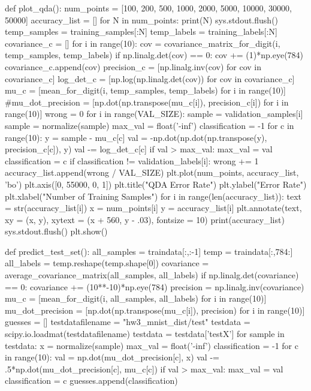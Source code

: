 \documentclass{article}
\begin{document}
\begin{python}
def plot_qda():
    num_points = [100, 200, 500, 1000, 2000, 5000, 10000, 30000, 50000]
    accuracy_list = []
    for N in num_points:
        print(N)
        sys.stdout.flush()
        temp_samples = training_samples[:N]
        temp_labels = training_labels[:N]
        covariance_c = []
        for i in range(10):
            cov = covariance_matrix_for_digit(i, temp_samples, temp_labels)
            if np.linalg.det(cov) == 0:
                cov += (1)*np.eye(784)
            covariance_c.append(cov)
        precision_c = [np.linalg.inv(cov) for cov in covariance_c]
        log_det_c = [np.log(np.linalg.det(cov)) for cov in covariance_c]
        mu_c = [mean_for_digit(i, temp_samples, temp_labels) for i in range(10)]
        #mu_dot_precision = [np.dot(np.transpose(mu_c[i]), precision_c[i]) for i in range(10)]
        wrong = 0
        for i in range(VAL_SIZE):
            sample = validation_samples[i]
            sample = normalize(sample)
            max_val = float('-inf')
            classification = -1
            for c in range(10):
                y = sample - mu_c[c]
                val = -np.dot(np.dot(np.transpose(y), precision_c[c]), y)
                val -= log_det_c[c]
                if val > max_val:
                    max_val = val
                    classification = c
            if classification != validation_labels[i]:
                wrong += 1
        accuracy_list.append(wrong / VAL_SIZE)
    plt.plot(num_points, accuracy_list, 'bo')
    plt.axis([0, 55000, 0, 1])
    plt.title("QDA Error Rate")
    plt.ylabel("Error Rate")
    plt.xlabel("Number of Training Samples")
    for i in range(len(accuracy_list)):
        text = str(accuracy_list[i])
        x = num_points[i]
        y = accuracy_list[i]
        plt.annotate(text, xy = (x, y), xytext = (x + 560, y - .03), fontsize = 10)
    print(accuracy_list)
    sys.stdout.flush()
    plt.show()

def predict_test_set():
    all_samples = traindata[:,:-1]
    temp = traindata[:,784:]
    all_labels = temp.reshape(temp.shape[0])
    covariance = average_covariance_matrix(all_samples, all_labels)
    if np.linalg.det(covariance) == 0:
        covariance += (10**-10)*np.eye(784)
    precision = np.linalg.inv(covariance)
    mu_c = [mean_for_digit(i, all_samples, all_labels) for i in range(10)]
    mu_dot_precision = [np.dot(np.transpose(mu_c[i]), precision) for i in range(10)]
    guesses = []
    testdatafilename = "hw3_mnist_dist/test"
    testdata = scipy.io.loadmat(testdatafilename)
    testdata = testdata['testX']
    for sample in testdata:
        x = normalize(sample)
        max_val = float('-inf')
        classification = -1
        for c in range(10):
            val = np.dot(mu_dot_precision[c], x)
            val -= .5*np.dot(mu_dot_precision[c], mu_c[c])
            if val > max_val:
                max_val = val
                classification = c
        guesses.append(classification)


\end{python}
\end{document}
